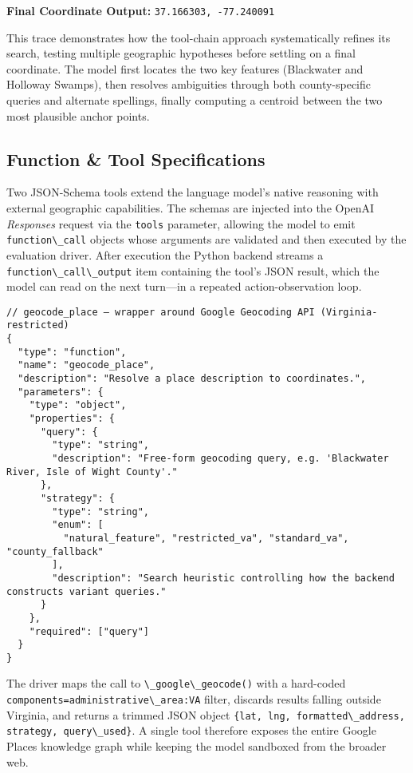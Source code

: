 \textbf{Final Coordinate Output:}
\passthrough{\lstinline!37.166303, -77.240091!}

This trace demonstrates how the tool-chain approach systematically
refines its search, testing multiple geographic hypotheses before
settling on a final coordinate. The model first locates the two key
features (Blackwater and Holloway Swamps), then resolves ambiguities
through both county-specific queries and alternate spellings, finally
computing a centroid between the two most plausible anchor points.

\subsection{Function \& Tool
Specifications}\label{a.4-function-tool-specifications}

Two JSON-Schema tools extend the language model's native reasoning with
external geographic capabilities. The schemas are injected into the
OpenAI \emph{Responses} request via the \passthrough{\lstinline!tools!}
parameter, allowing the model to emit
\passthrough{\lstinline!function\_call!} objects whose arguments are
validated and then executed by the evaluation driver. After execution
the Python backend streams a
\passthrough{\lstinline!function\_call\_output!} item containing the
tool's JSON result, which the model can read on the next turn---in a
repeated action-observation loop.

\begin{lstlisting}
// geocode_place – wrapper around Google Geocoding API (Virginia-restricted)
{
  "type": "function",
  "name": "geocode_place",
  "description": "Resolve a place description to coordinates.",
  "parameters": {
    "type": "object",
    "properties": {
      "query": {
        "type": "string",
        "description": "Free-form geocoding query, e.g. 'Blackwater River, Isle of Wight County'."
      },
      "strategy": {
        "type": "string",
        "enum": [
          "natural_feature", "restricted_va", "standard_va", "county_fallback"
        ],
        "description": "Search heuristic controlling how the backend constructs variant queries."
      }
    },
    "required": ["query"]
  }
}
\end{lstlisting}

The driver maps the call to
\passthrough{\lstinline!\_google\_geocode()!} with a hard-coded
\passthrough{\lstinline!components=administrative\_area:VA!} filter,
discards results falling outside Virginia, and returns a trimmed JSON
object
\passthrough{\lstinline!\{lat, lng, formatted\_address, strategy, query\_used\}!}.
A single tool therefore exposes the entire Google Places knowledge graph
while keeping the model sandboxed from the broader web.

